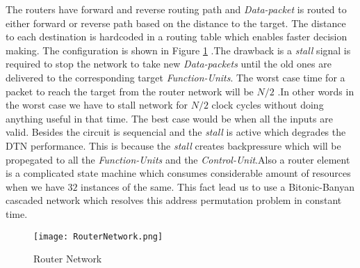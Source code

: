 					      
					      The routers have forward and reverse routing path and \textit{Data-packet} is routed to either forward or reverse path based on the distance to the target. The distance to each destination is hardcoded 
					      in a routing table which enables faster decision making. The configuration is shown in Figure \ref{fig:RouterNetwork} .The drawback is a \textit{stall} signal is required
					      to stop the network to take new  \textit{Data-packets} until the old ones are delivered to the corresponding target  \textit{Function-Units}. The worst case time for a packet to reach the target
					      from the router network will be $N / 2$ .In other words in the worst case we have to stall network for $N/2$ clock cycles without doing anything useful in that time. The best
					      case would be when all the inputs are valid. Besides the circuit is sequencial and the \textit{stall} is active which degrades the DTN performance. This is because the \textit{stall} creates backpressure which
					      will be propegated to all the \textit{Function-Units} and the \textit{Control-Unit}.Also a router element is a complicated state machine which consumes considerable amount of resources when we have $32$ instances of the same. 
					      This fact lead us to use a Bitonic-Banyan\cite{batcher_banyan_ref} cascaded network which resolves this address permutation problem in constant time.
					      \begin{figure}[!ht]
							\texttt{[image: RouterNetwork.png]}
						      \caption{Router Network}
					      \label{fig:RouterNetwork}
					      \end{figure}
